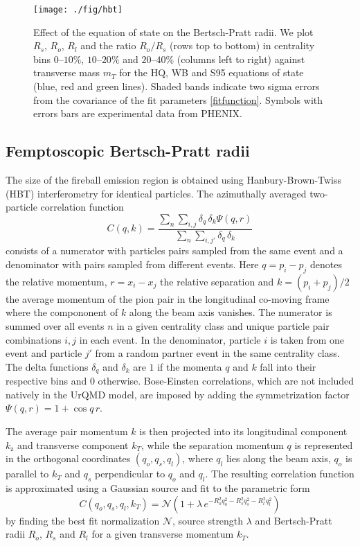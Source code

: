 \documentclass[aps,prc,reprint,amsmath,nofootinbib,superscriptaddress]{revtex4-1}
\begin{document}
\begin{figure*}[t]
  \texttt{[image: ./fig/hbt]}
  \caption{
    \label{fig:hbt} Effect of the equation of state on the Bertsch-Pratt radii. We plot $R_s$, $R_o$, $R_l$ and the ratio $R_o/R_s$ (rows top to bottom) 
    in centrality bins $0$--$10\%$, $10$--$20\%$ and $20$--$40\%$ (columns left to right) against transverse mass $m_T$ for the HQ, WB and S95 equations of state 
    (blue, red and green lines). Shaded bands indicate two sigma errors from the covariance of the fit parameters \eqref{fitfunction}. Symbols with errors bars 
    are experimental data from PHENIX.  
  }
\end{figure*}

\subsection{Femptoscopic Bertsch-Pratt radii}
\label{hbt}

The size of the fireball emission region is obtained using Hanbury-Brown-Twiss (HBT) interferometry for identical particles. The azimuthally averaged two-particle correlation function 
\begin{equation}
 \label{c2}
 C(q, k) = \frac{\sum\limits_n \sum\limits_{i, j} \delta_{q} \, \delta_{k}\Psi(q,r)}{\sum\limits_{n} \sum\limits_{i,j'} \delta_{q} \, \delta_{k}}
\end{equation}
consists of a numerator with particles pairs sampled from the same event and a denominator with pairs sampled from different events. Here $q = p_i - p_j$ denotes the relative momentum, $r=x_i-x_j$ the relative separation and $k = (p_i + p_j)/2$ the average momentum of the pion pair in the longitudinal co-moving 
frame where the compononent of $k$ along the beam axis vanishes. The numerator is summed over all events $n$ in a given centrality class and unique particle pair combinations $i,j$ in each event. In the denominator, particle $i$ is
taken from one event and particle $j'$ from a random partner event in the same centrality class. The delta functions $\delta_q$ and $\delta_k$ are $1$ if the momenta $q$ and $k$ fall into their respective bins and $0$ otherwise. Bose-Einsten 
correlations, which are not included natively in the UrQMD model, are imposed by adding the symmetrization factor $\Psi(q,r) = 1 + \cos q\,r$. 

The average pair momentum $k$ is then projected into its longitudinal component $k_\text{z}$ and transverse component $k_T$, while the separation momentum $q$ is represented in the orthogonal coordinates 
$(q_o, q_s, q_l)$, where $q_l$ lies along the beam axis, $q_o$ is parallel to $k_T$ and $q_s$ perpendicular to $q_o$ and $q_l$. The resulting correlation function is approximated using a Gaussian source and 
fit to the parametric form
\begin{equation}
 \label{fitfunction}
 C(q_o, q_s, q_l, k_T) = \mathcal{N} \left(1 + \lambda\, e^{-R_o^2 q_o^2 - R_s^2 q_s^2 - R_l^2 q_l^2} \right) 
\end{equation}
by finding the best fit normalization $\mathcal{N}$, source strength $\lambda$ and Bertsch-Pratt radii $R_o$, $R_s$ and $R_l$ for a given transverse momentum $k_T$. 
\end{document}
